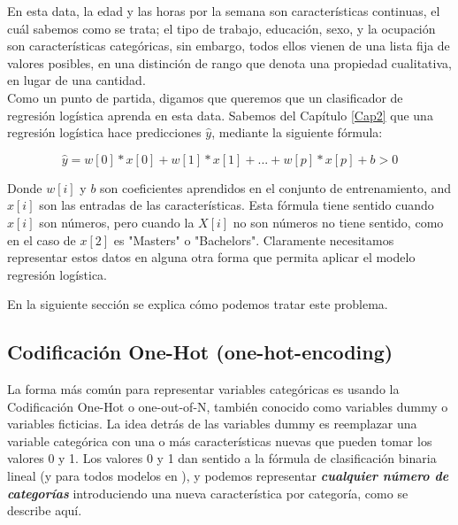 	
En esta data, la edad y las horas por la semana son características continuas, el cuál sabemos como se trata; el tipo de trabajo, educación,  sexo, y la ocupación son características  categóricas, sin embargo, todos ellos vienen de una lista fija de valores posibles, en una distinción de rango que denota una  propiedad cualitativa, en lugar de una cantidad.\\	
	



Como un punto de partida, digamos que queremos que un clasificador de regresión logística  aprenda  en esta data.  Sabemos  del Capítulo \ref{Cap2} que  una regresión logística hace predicciones   $\hat{y}$, mediante la siguiente fórmula:

\[ \hat{y} = w[0] * x[0] + w[1] * x[1] + ... + w[p] * x[p] + b > 0 \]


Donde $w[i]$ y  $b$ son coeficientes aprendidos en el conjunto de entrenamiento,   and $x[i]$ son las entradas de las características.    Esta fórmula tiene sentido cuando $ x[i]$ son números, pero cuando la $X[i]$ no son números no tiene sentido, como en el caso de $x[2]$  es "Masters"{} o "Bachelors".
Claramente necesitamos representar estos datos en alguna otra forma que permita aplicar el modelo regresión logística. 

En la  siguiente sección se explica cómo podemos  tratar este problema.
	

\subsection{Codificación One-Hot  (one-hot-encoding) }	

 
La forma más común para representar variables categóricas es usando la Codificación One-Hot   o  one-out-of-N, también conocido como  variables dummy o variables ficticias. La idea detrás de las  variables dummy es reemplazar una variable categórica con una o más características nuevas que pueden tomar los  valores 0 y 1. Los valores 0 y 1 dan sentido a la fórmula de clasificación binaria lineal (y para todos  modelos en {}), y podemos representar  {\bf \emph{cualquier número de  categorías} }   introduciendo una nueva característica  por  categoría, como se describe aquí.\\


